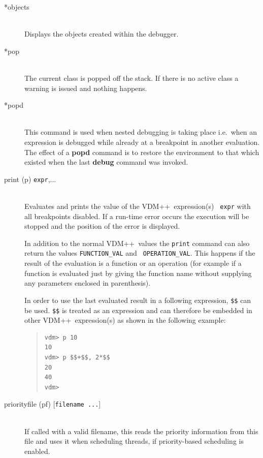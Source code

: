 \documentclass[\pformat,12pt]{article}
\newcommand{\vdmslpp}{VDM++}
\begin{document}
\begin{description}
\item[*objects] \mbox{}\\
  Displays the objects created within the debugger.
  
\item[*pop] \mbox{}\\
  The current class is popped off the stack. 
If there is no active class a warning is issued and
  nothing happens.

\item[*popd] \mbox{}\\
  This command is used when nested debugging is taking place i.e.\ when
  an expression is debugged while already at a breakpoint in another
  evaluation. The effect of a
  \textbf{popd} command is to restore the environment to that which
  existed when the last \textbf{debug} command was invoked.
 
\item[print (p) {\tt expr},...] \mbox{}\\
  Evaluates and prints the value of the \vdmslpp\ expression(s) {\tt
    expr} with all breakpoints disabled. If a run-time error occurs
  the execution will be stopped and the position of the error is
  displayed.

  In addition to the normal \vdmslpp\ values the {\tt print} command
  can also return the values {\tt FUNCTION\_VAL} and {\tt
    OPERATION\_VAL}\@.  This happens if the result of the evaluation is
  a function or an operation (for example if a function
  is evaluated just by giving the function name without supplying any
  parameters enclosed in parenthesis).
  
  In order to use the last evaluated result in a following expression,
  {\tt \$\$} can be used.  {\tt \$\$} is treated as an expression and
  can therefore be embedded in other \vdmslpp\ expression(s) as shown
  in the following   example:

\begin{quote}
\begin{verbatim}
vdm> p 10
10
vdm> p $$+$$, 2*$$
20
40
vdm> 
\end{verbatim}
\end{quote}

\item[priorityfile (pf) \mbox{[{\tt filename ...}]}] \mbox{}\\
  If called with a valid filename, this reads the priority information
  from this file and uses it when scheduling threads, if
  priority-based scheduling is enabled.
  

\end{description}
\end{document}
